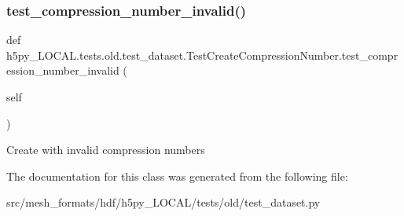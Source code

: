 \subsubsection{\texorpdfstring{test\+\_\+compression\+\_\+number\+\_\+invalid()}{test\_compression\_number\_invalid()}}
{\footnotesize\ttfamily def h5py\+\_\+\+L\+O\+C\+A\+L.\+tests.\+old.\+test\+\_\+dataset.\+Test\+Create\+Compression\+Number.\+test\+\_\+compression\+\_\+number\+\_\+invalid (\begin{DoxyParamCaption}\item[{}]{self }\end{DoxyParamCaption})}

\begin{DoxyVerb}Create with invalid compression numbers  \end{DoxyVerb}
 

The documentation for this class was generated from the following file\+:\begin{DoxyCompactItemize}
\item 
src/mesh\+\_\+formats/hdf/h5py\+\_\+\+L\+O\+C\+A\+L/tests/old/test\+\_\+dataset.\+py\end{DoxyCompactItemize}
